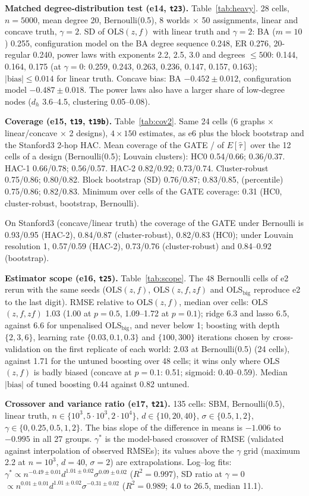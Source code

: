 \textbf{Matched degree-distribution test (e14, \texttt{t23}).} Table~\ref{tab:heavy}.  28 cells, $n=5000$, mean degree 20, Bernoulli(0.5), 8 worlds $\times$ 50 assignments, linear and concave truth, $\gamma=2$. SD of OLS$(z,f)$ with linear truth and $\gamma=2$: BA ($m=10$) 0.255, configuration model on the BA degree sequence 0.248, ER 0.276, 20-regular 0.240, power laws with exponents 2.2, 2.5, 3.0 and degrees $\le500$: 0.144, 0.164, 0.175 (at $\gamma=0$: 0.259, 0.243, 0.263, 0.236, 0.147, 0.157, 0.163); $|\text{bias}|\le0.014$ for linear truth. Concave bias: BA $-0.452\pm0.012$, configuration model $-0.487\pm0.018$. The power laws also have a larger share of low-degree nodes ($d_h$ 3.6--4.5, clustering 0.05--0.08).

\textbf{Coverage (e15, \texttt{t19}, \texttt{t19b}).} Table~\ref{tab:cov2}.  Same 24 cells (6 graphs $\times$ linear/concave $\times$ 2 designs), $4\times150$ estimates, as e6 plus the block bootstrap and the Stanford3 2-hop HAC. Mean coverage of the GATE / of $E[\hat\tau]$ over the 12 cells of a design (Bernoulli(0.5); Louvain clusters): HC0 0.54/0.66; 0.36/0.37. HAC-1 0.66/0.78; 0.56/0.57. HAC-2 0.82/0.92; 0.73/0.74. Cluster-robust 0.75/0.86; 0.80/0.82. Block bootstrap (SD) 0.76/0.87; 0.83/0.85, (percentile) 0.75/0.86; 0.82/0.83. Minimum over cells of the GATE coverage: 0.31 (HC0, cluster-robust, bootstrap, Bernoulli).

On Stanford3 (concave/linear truth) the coverage of the GATE under Bernoulli is 0.93/0.95 (HAC-2), 0.84/0.87 (cluster-robust), 0.82/0.83 (HC0); under Louvain resolution 1, 0.57/0.59 (HAC-2), 0.73/0.76 (cluster-robust) and 0.84--0.92 (bootstrap).

\textbf{Estimator scope (e16, \texttt{t25}).} Table~\ref{tab:scope}.  The 48 Bernoulli cells of e2 rerun with the same seeds (OLS$(z,f)$, OLS$(z,f,zf)$ and OLS$_\text{big}$ reproduce e2 to the last digit). RMSE relative to OLS$(z,f)$, median over cells: OLS$(z,f,zf)$ 1.03 (1.00 at $p=0.5$, 1.09--1.72 at $p=0.1$); ridge 6.3 and lasso 6.5, against 6.6 for unpenalised OLS$_\text{big}$, and never below 1; boosting with depth $\{2,3,6\}$, learning rate $\{0.03,0.1,0.3\}$ and $\{100,300\}$ iterations chosen by cross-validation on the first replicate of each world: 2.03 at Bernoulli(0.5) (24 cells), against 1.71 for the untuned boosting over 48 cells; it wins only where OLS$(z,f)$ is badly biased (concave at $p=0.1$: 0.51; sigmoid: 0.40--0.59). Median $|\text{bias}|$ of tuned boosting 0.44 against 0.82 untuned.

\textbf{Crossover and variance ratio (e17, \texttt{t21}).} 135 cells: SBM, Bernoulli(0.5), linear truth, $n\in\{10^3,5\cdot10^3,2\cdot10^4\}$, $d\in\{10,20,40\}$, $\sigma\in\{0.5,1,2\}$, $\gamma\in\{0,0.25,0.5,1,2\}$. The bias slope of the difference in means is $-1.006$ to $-0.995$ in all 27 groups. $\gamma^*$ is the model-based crossover of RMSE (validated against interpolation of observed RMSEs); its values above the $\gamma$ grid (maximum 2.2 at $n=10^3$, $d=40$, $\sigma=2$) are extrapolations. Log--log fits: $\gamma^*\propto n^{-0.49\pm0.01}d^{1.01\pm0.02}\sigma^{0.09\pm0.02}$ ($R^2=0.997$), SD ratio at $\gamma=0$ $\propto n^{0.01\pm0.01}d^{1.01\pm0.02}\sigma^{-0.31\pm0.02}$ ($R^2=0.989$; 4.0 to 26.5, median 11.1).


